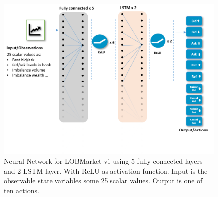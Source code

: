 \documentclass{kththesis}
\theoremstyle{definition}
\begin{document}
\begin{figure}[H]
    \centering
    \includegraphics[scale=.5]{Imgs/nnalob1.png}
    \caption{Neural Network for LOBMarket-v1 using 5 fully connected layers and 2 LSTM layer. With ReLU as activation function. Input is the observable state variables some 25 scalar values. Output is one of ten actions.}
    \label{fig:e4}
\end{figure}
\end{document}
